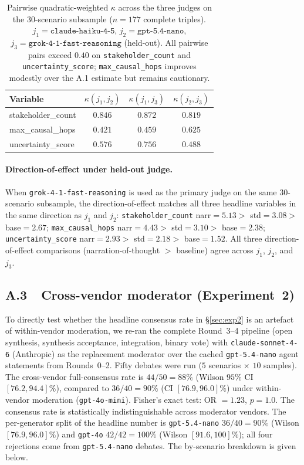 \documentclass[11pt]{article}
\begin{document}
\begin{table}[t]
\centering
\small
\begin{tabular}{lccc}
\toprule
Variable & $\kappa(j_1,j_2)$ & $\kappa(j_1,j_3)$ & $\kappa(j_2,j_3)$ \\
\midrule
stakeholder\_count & $0.846$ & $0.872$ & $0.819$ \\
max\_causal\_hops  & $0.421$ & $0.459$ & $0.625$ \\
uncertainty\_score & $0.576$ & $0.756$ & $0.488$ \\
\bottomrule
\end{tabular}
\caption{Pairwise quadratic-weighted $\kappa$ across the three judges on
the 30-scenario subsample ($n = 177$ complete triples). $j_1 =
\texttt{claude-haiku-4-5}$, $j_2 = \texttt{gpt-5.4-nano}$, $j_3 =
\texttt{grok-4-1-fast-reasoning}$ (held-out). All pairwise pairs exceed
$0.40$ on \texttt{stakeholder\_count} and \texttt{uncertainty\_score};
\texttt{max\_causal\_hops} improves modestly over the A.1 estimate
but remains cautionary.}
\label{tab:kappa3}
\end{table}

\paragraph{Direction-of-effect under held-out judge.}
When \texttt{grok-4-1-fast-reasoning} is used as the primary judge on the
same $30$-scenario subsample, the direction-of-effect matches all three
headline variables in the same direction as $j_1$ and $j_2$:
\texttt{stakeholder\_count} narr$=5.13 >$ std$=3.08 >$ base$=2.67$;
\texttt{max\_causal\_hops} narr$=4.43 >$ std$=3.10 >$ base$=2.38$;
\texttt{uncertainty\_score} narr$=2.93 >$ std$=2.18 >$ base$=1.52$.
All three direction-of-effect comparisons (narration-of-thought $>$ baseline)
agree across $j_1$, $j_2$, and $j_3$.

\subsection*{A.3~~Cross-vendor moderator (Experiment~2)}

To directly test whether the headline consensus rate in
\S\ref{sec:exp2} is an artefact of within-vendor moderation, we re-ran
the complete Round~3--4 pipeline (open synthesis, synthesis acceptance,
integration, binary vote) with \texttt{claude-sonnet-4-6} (Anthropic) as
the replacement moderator over the cached \texttt{gpt-5.4-nano} agent
statements from Rounds~0--2. Fifty debates were run ($5$ scenarios
$\times$ $10$ samples). The cross-vendor full-consensus rate is
$44/50 = 88\%$ (Wilson $95\%$ CI $[76.2, 94.4]\%$), compared to
$36/40 = 90\%$ (CI $[76.9, 96.0]\%$) under within-vendor moderation
(\texttt{gpt-4o-mini}). Fisher's exact test: OR $= 1.23$, $p = 1.0$.
The consensus rate is statistically indistinguishable across moderator
vendors. The per-generator split of the headline number is
\texttt{gpt-5.4-nano} $36/40 = 90\%$ (Wilson $[76.9, 96.0]\%$) and
\texttt{gpt-4o} $42/42 = 100\%$ (Wilson $[91.6, 100]\%$); all four
rejections come from \texttt{gpt-5.4-nano} debates. The by-scenario
breakdown is given below.
\end{document}
